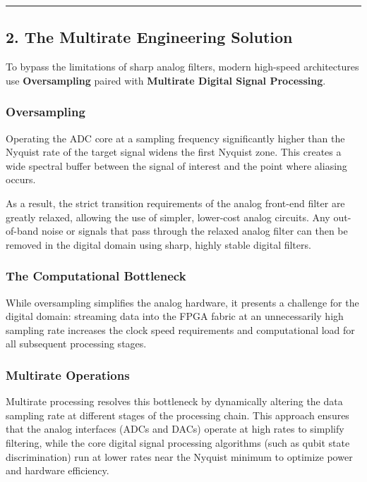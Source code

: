 \documentclass[
]{article}
\begin{document}
\begin{center}\rule{0.5\linewidth}{0.5pt}\end{center}

\subsection{2. The Multirate Engineering
Solution}\label{the-multirate-engineering-solution}

To bypass the limitations of sharp analog filters, modern high-speed
architectures use \textbf{Oversampling} paired with \textbf{Multirate
Digital Signal Processing}.

\subsubsection{Oversampling}\label{oversampling}

Operating the ADC core at a sampling frequency significantly higher than
the Nyquist rate of the target signal widens the first Nyquist zone.
This creates a wide spectral buffer between the signal of interest and
the point where aliasing occurs.

As a result, the strict transition requirements of the analog front-end
filter are greatly relaxed, allowing the use of simpler, lower-cost
analog circuits. Any out-of-band noise or signals that pass through the
relaxed analog filter can then be removed in the digital domain using
sharp, highly stable digital filters.

\subsubsection{The Computational
Bottleneck}\label{the-computational-bottleneck}

While oversampling simplifies the analog hardware, it presents a
challenge for the digital domain: streaming data into the FPGA fabric at
an unnecessarily high sampling rate increases the clock speed
requirements and computational load for all subsequent processing
stages.

\subsubsection{Multirate Operations}\label{multirate-operations-1}

Multirate processing resolves this bottleneck by dynamically altering
the data sampling rate at different stages of the processing chain. This
approach ensures that the analog interfaces (ADCs and DACs) operate at
high rates to simplify filtering, while the core digital signal
processing algorithms (such as qubit state discrimination) run at lower
rates near the Nyquist minimum to optimize power and hardware
efficiency.
\end{document}
